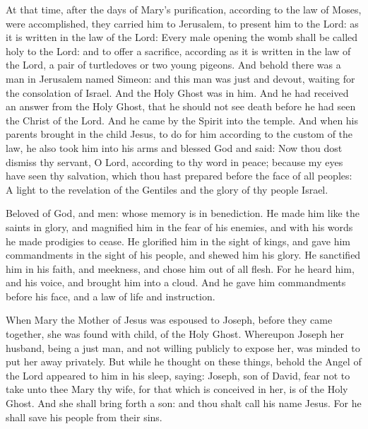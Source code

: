\columnbreak


At that time,
after the days of Mary's purification, according to the law of
Moses, were accomplished, they carried him to Jerusalem, to present him
to the Lord:
as it is written in the law of the Lord: Every male opening the
womb shall be called holy to the Lord:
and to offer a sacrifice, according as it is written in the law of
the Lord, a pair of turtledoves or two young pigeons.
And behold there was a man in Jerusalem named Simeon: and this man
was just and devout, waiting for the consolation of Israel. And the Holy
Ghost was in him.
And he had received an answer from the Holy Ghost, that he should
not see death before he had seen the Christ of the Lord.
And he came by the Spirit into the temple. And when his parents
brought in the child Jesus, to do for him according to the custom of the
law,
he also took him into his arms and blessed God and said:
Now thou dost dismiss thy servant, O Lord, according to thy word
in peace;
because my eyes have seen thy salvation,
which thou hast prepared before the face of all peoples:
A light to the revelation of the Gentiles and the glory of thy
people Israel.





Beloved of God, and men: whose memory is in benediction.  He made him
like the saints in glory, and magnified him in the fear of his enemies, and
with his words he made prodigies to cease.  He glorified him in the sight of
kings, and gave him commandments in the sight of his people, and shewed him his
glory.  He sanctified him in his faith, and meekness, and chose him out of all
flesh.  For he heard him, and his voice, and brought him into a cloud.  And he
gave him commandments before his face, and a law of life and instruction.




When Mary the Mother of Jesus was
espoused to Joseph, before they came together, she was found with child, of the
Holy Ghost.  Whereupon Joseph her husband, being a just man, and not willing
publicly to expose her, was minded to put her away privately.  But while he
thought on these things, behold the Angel of the Lord appeared to him in his
sleep, saying: Joseph, son of David, fear not to take unto thee Mary thy wife,
for that which is conceived in her, is of the Holy Ghost.  And she shall bring
forth a son: and thou shalt call his name Jesus. For he shall save his people
from their sins.


